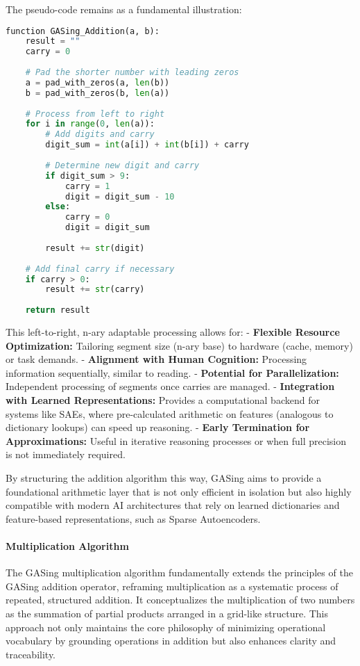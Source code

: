The pseudo-code remains as a fundamental illustration:

\begin{lstlisting}[language=Python,caption={GASing\_Addition Algorithm}]
function GASing_Addition(a, b):
    result = ""
    carry = 0
    
    # Pad the shorter number with leading zeros
    a = pad_with_zeros(a, len(b))
    b = pad_with_zeros(b, len(a))
    
    # Process from left to right
    for i in range(0, len(a)):
        # Add digits and carry
        digit_sum = int(a[i]) + int(b[i]) + carry
        
        # Determine new digit and carry
        if digit_sum > 9:
            carry = 1
            digit = digit_sum - 10
        else:
            carry = 0
            digit = digit_sum
            
        result += str(digit)
    
    # Add final carry if necessary
    if carry > 0:
        result += str(carry)
        
    return result
\end{lstlisting}

This left-to-right, n-ary adaptable processing allows for:
-   \textbf{Flexible Resource Optimization:} Tailoring segment size (n-ary base) to hardware (cache, memory) or task demands.
-   \textbf{Alignment with Human Cognition:} Processing information sequentially, similar to reading.
-   \textbf{Potential for Parallelization:} Independent processing of segments once carries are managed.
-   \textbf{Integration with Learned Representations:} Provides a computational backend for systems like SAEs, where pre-calculated arithmetic on features (analogous to dictionary lookups) can speed up reasoning.
-   \textbf{Early Termination for Approximations:} Useful in iterative reasoning processes or when full precision is not immediately required.

By structuring the addition algorithm this way, GASing aims to provide a foundational arithmetic layer that is not only efficient in isolation but also highly compatible with modern AI architectures that rely on learned dictionaries and feature-based representations, such as Sparse Autoencoders.
\paragraph{Multiplication Algorithm}

The GASing multiplication algorithm fundamentally extends the principles of the GASing addition operator, reframing multiplication as a systematic process of repeated, structured addition. It conceptualizes the multiplication of two numbers as the summation of partial products arranged in a grid-like structure. This approach not only maintains the core philosophy of minimizing operational vocabulary by grounding operations in addition but also enhances clarity and traceability.

